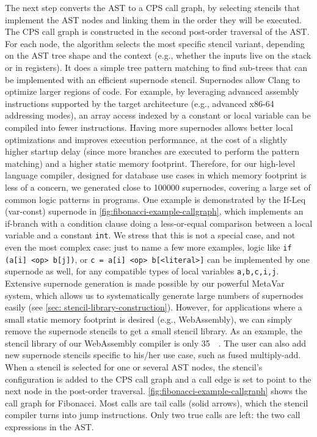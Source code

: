 \documentclass[acmsmall,nonacm,screen]{acmart}\settopmatter{printfolios=true,printccs=true,printacmref=false}
\newcommand{\figref}[1]{\autoref{#1}}
\newcommand{\secref}[1]{\autoref{#1}}
\newcommand\code[1]{\lstinline[mathescape=true,basicstyle=\ttfamily\normalsize]|#1|}
\newcommand{\wasmStencilSize}{\SI{35}{\kilo\byte}}%
\begin{document}
The next step converts the AST to a CPS call graph, by selecting stencils that implement the AST nodes and linking them in the order they will be executed. The CPS call graph is constructed in the second post-order traversal of the AST. For each node, the algorithm selects the most specific stencil variant, depending on the AST tree shape and the context (e.g., whether the inputs live on the stack or in registers). It does a simple tree pattern matching to find sub-trees that can be implemented with an efficient supernode stencil. Supernodes allow Clang to optimize larger regions of code. For example, by leveraging advanced assembly instructions supported by the target architecture (e.g., advanced x86-64 addressing modes), an array access indexed by a constant or local variable can be compiled into fewer instructions. Having more supernodes allows better local optimizations and improves execution performance, at the cost of a slightly higher startup delay (since more branches are executed to perform the pattern matching) and a higher static memory footprint. Therefore, for our high-level language compiler, designed for database use cases in which memory footprint is less of a concern, we generated close to \num{100000} supernodes, covering a large set of common logic patterns in programs. One example is demonstrated by the If-Leq (var-const) supernode in \figref{fig:fibonacci-example-callgraph}, which implements an if-branch with a condition clause doing a less-or-equal comparison between a local variable and a constant \code{int}. We stress that this is not a special case, and not even the most complex case: just to name a few more examples, logic like \code{if (a[i] <op> b[j])}, or \code{c = a[i] <op> b[<literal>]} can be implemented by one supernode as well, for any compatible types of local variables \code{a,b,c,i,j}. Extensive supernode generation is made possible by our powerful MetaVar system, which allows us to systematically generate large numbers of supernodes easily (see \secref{sec: stencil-library-construction}). However, for applications where a small static memory footprint is desired (e.g., WebAssembly), we can simply remove the supernode stencils to get a small stencil library. As an example, the stencil library of our WebAssembly compiler is only \wasmStencilSize{}. The user can also add new supernode stencils specific to his/her use case, such as fused multiply-add. When a stencil is selected for one or several AST nodes, the stencil's configuration is added to the CPS call graph and a call edge is set to point to the next node in the post-order traversal. \figref{fig:fibonacci-example-callgraph} shows the call graph for Fibonacci. Most calls are tail calls (solid arrows), which the stencil compiler turns into jump instructions. Only two true calls are left: the two call expressions in the AST. %
\end{document}
